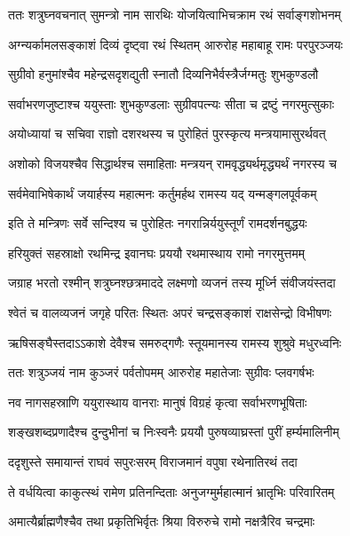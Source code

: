 \twolineshloka
{ततः शत्रुघ्नवचनात् सुमन्त्रो नाम सारथिः}
{योजयित्वाभिचक्राम रथं सर्वाङ्गशोभनम्} %

\twolineshloka
{अग्न्यर्कामलसङ्काशं दिव्यं दृष्ट्वा रथं स्थितम्}
{आरुरोह महाबाहू रामः परपुरञ्जयः} %

\twolineshloka
{सुग्रीवो हनुमांश्चैव महेन्द्रसदृशद्युती}
{स्नातौ दिव्यनिभैर्वस्त्रैर्जग्मतुः शुभकुण्डलौ} %

\twolineshloka
{सर्वाभरणजुष्टाश्च ययुस्ताः शुभकुण्डलाः}
{सुग्रीवपत्न्यः सीता च द्रष्टुं नगरमुत्सुकाः} %

\twolineshloka
{अयोध्यायां च सचिवा राज्ञो दशरथस्य च}
{पुरोहितं पुरस्कृत्य मन्त्रयामासुरर्थवत्} %

\twolineshloka
{अशोको विजयश्चैव सिद्धार्थश्च समाहिताः}
{मन्त्रयन् रामवृद्ध्यर्थमृद्ध्यर्थं नगरस्य च} %

\twolineshloka
{सर्वमेवाभिषेकार्थं जयार्हस्य महात्मनः}
{कर्तुमर्हथ रामस्य यद् यन्मङ्गलपूर्वकम्} %

\twolineshloka
{इति ते मन्त्रिणः सर्वे सन्दिश्य च पुरोहितः}
{नगरान्निर्ययुस्तूर्णं रामदर्शनबुद्धयः} %

\twolineshloka
{हरियुक्तं सहस्राक्षो रथमिन्द्र इवानघः}
{प्रययौ रथमास्थाय रामो नगरमुत्तमम्} %

\twolineshloka
{जग्राह भरतो रश्मीन् शत्रुघ्नश्छत्रमाददे}
{लक्ष्मणो व्यजनं तस्य मूर्ध्नि संवीजयंस्तदा} %

\twolineshloka
{श्वेतं च वालव्यजनं जगृहे परितः स्थितः}
{अपरं चन्द्रसङ्काशं राक्षसेन्द्रो विभीषणः} %

\twolineshloka
{ऋषिसङ्घैस्तदाऽऽकाशे देवैश्च समरुद्गणैः}
{स्तूयमानस्य रामस्य शुश्रुवे मधुरध्वनिः} %

\twolineshloka
{ततः शत्रुञ्जयं नाम कुञ्जरं पर्वतोपमम्}
{आरुरोह महातेजाः सुग्रीवः प्लवगर्षभः} %

\twolineshloka
{नव नागसहस्राणि ययुरास्थाय वानराः}
{मानुषं विग्रहं कृत्वा सर्वाभरणभूषिताः} %

\twolineshloka
{शङ्खशब्दप्रणादैश्च दुन्दुभीनां च निःस्वनैः}
{प्रययौ पुरुषव्याघ्रस्तां पुरीं हर्म्यमालिनीम्} %

\twolineshloka
{ददृशुस्ते समायान्तं राघवं सपुरःसरम्}
{विराजमानं वपुषा रथेनातिरथं तदा} %

\twolineshloka
{ते वर्धयित्वा काकुत्स्थं रामेण प्रतिनन्दिताः}
{अनुजग्मुर्महात्मानं भ्रातृभिः परिवारितम्} %

\twolineshloka
{अमात्यैर्ब्राह्मणैश्चैव तथा प्रकृतिभिर्वृतः}
{श्रिया विरुरुचे रामो नक्षत्रैरिव चन्द्रमाः} %

